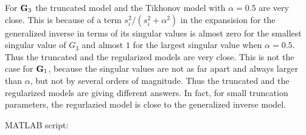 \documentclass[11pt]{article}
\begin{document}
For $\mathbf{G}_3$ the truncated model and the Tikhonov model with $\alpha=0.5$ are very close. This is because of a term $s_i^2/(s_i^2+\alpha^2)$ in the expansision for the generalized inverse in terms of its singular values is almost zero for the smallest singular value of $G_3$ and almost $1$ for the largest singular value when $\alpha = 0.5$. Thus the truncated and the regularized models are very close. 
This is not the case for $\mathbf{G}_1$, because the singular values are not as far apart and always larger than $\alpha$, but not by several orders of magnitude. Thus the truncated and the regularized models are giving different answers. In fact, for small truncation parameters, the regurlazied model is close to the generalized inverse model.

\noindent MATLAB script:

\end{document}
